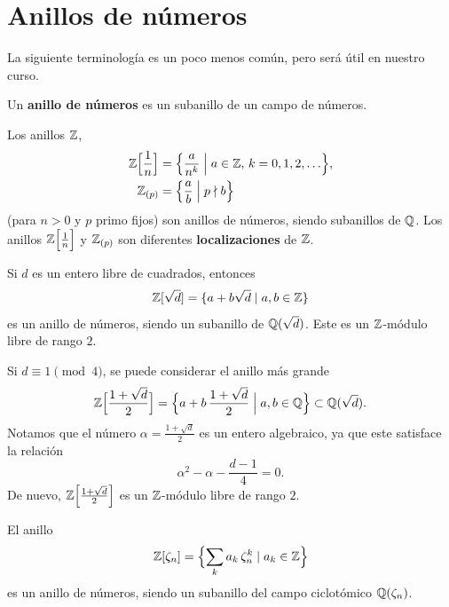 
\section{Anillos de números}

La siguiente terminología es un poco menos común, pero será útil en nuestro
curso.

\begin{definicion}
  Un \textbf{anillo de números} es un subanillo de un campo de números.
\end{definicion}

\begin{ejemplo}
  Los anillos $\mathbb{Z}$,
  \begin{align*}
    \mathbb{Z} \Bigl[\frac{1}{n}\Bigr] & =
        \Bigl\{ \frac{a}{n^k} \Bigm| a \in \mathbb{Z}, \, k = 0,1,2,\ldots \Bigr\},\\
    \mathbb{Z}_{(p)} & = \Bigl\{ \frac{a}{b} \Bigm| p \nmid b \Bigr\}
  \end{align*}
  (para $n > 0$ y $p$ primo fijos) son anillos de números, siendo subanillos de
  $\mathbb{Q}$. Los anillos $\mathbb{Z} \Bigl[\frac{1}{n}\Bigr]$ y $\mathbb{Z}_{(p)}$ son diferentes
  \textbf{localizaciones} de $\mathbb{Z}$.
\end{ejemplo}

\begin{ejemplo}
  Si $d$ es un entero libre de cuadrados, entonces
  $$\mathbb{Z} [\sqrt{d}] = \{ a + b\sqrt{d} \mid a,b\in \mathbb{Z} \}$$
  es un anillo de números, siendo un subanillo de $\mathbb{Q} (\sqrt{d})$. Este es un
  $\mathbb{Z}$-módulo libre de rango $2$.

  Si $d \equiv 1 \pmod{4}$, se puede considerar el anillo más grande
  \[ \mathbb{Z} \Bigl[\frac{1 + \sqrt{d}}{2}\Bigr] =
         \Bigl\{ a + b\,\frac{1 + \sqrt{d}}{2} \Bigm| a,b \in \mathbb{Q} \Bigr\}
             \subset \mathbb{Q} (\sqrt{d}). \]
  Notamos que el número $\alpha = \frac{1 + \sqrt{d}}{2}$ es un entero
  algebraico, ya que este satisface la relación
  $$\alpha^2 - \alpha - \frac{d-1}{4} = 0.$$
  De nuevo, $\mathbb{Z} \Bigl[\frac{1 + \sqrt{d}}{2}\Bigr]$ es un $\mathbb{Z}$-módulo libre de
  rango $2$.
\end{ejemplo}

\begin{ejemplo}
  El anillo
  $$\mathbb{Z} [\zeta_n] = \Bigl\{ \sum_k a_k \, \zeta_n^k \mid a_k \in \mathbb{Z} \Bigr\}$$
  es un anillo de números, siendo un subanillo del campo ciclotómico
  $\mathbb{Q} (\zeta_n)$.
\end{ejemplo}

